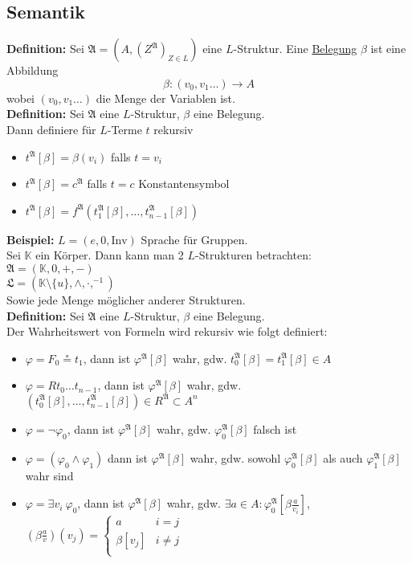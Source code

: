 \documentclass[a4paper]{scrartcl}
\newcommand{\mfa}{\mathfrak{A}}  %
\begin{document}
\subsection{Semantik}
\textbf{Definition:} Sei $\mathfrak{A}=(A,(Z^\mathfrak{A})_{Z \in L})$ eine $L$-Struktur. Eine \underline{Belegung} $\beta$ ist eine Abbildung
$$\beta \colon (v_0,v_1 \dots) \rightarrow A$$
wobei $(v_0,v_1 \dots)$ die Menge der Variablen ist.\medskip\\
\textbf{Definition:} Sei $\mathfrak{A}$ eine $L$-Struktur, $\beta$ eine Belegung.\\
Dann definiere für $L$-Terme $t$ rekursiv
\begin{itemize}
\item $t^\mathfrak{A}[\beta] = \beta(v_i)$ falls $t = v_i$
\item $t^\mathfrak{A}[\beta] = c^\mathfrak{A}$ falls $t = c$ Konstantensymbol
\item $t^\mathfrak{A}[\beta] = f^\mathfrak{A}(t_1^\mathfrak{A}[\beta], \dots ,t_{n-1}^\mathfrak{A}[\beta])$
\end{itemize}
\textbf{Beispiel:} $L=(e,0,\text{Inv})$ Sprache für Gruppen.\\
Sei $\mathbb{K}$ ein Körper. Dann kann man 2 $L$-Strukturen betrachten:\smallskip\\
$\mathfrak{A} = (\mathbb{K},0,+,-)$\\
$\mathfrak{L} = (\mathbb{K} \setminus \{u\},\land,\cdot,^{-1})$\smallskip\\
Sowie jede Menge möglicher anderer Strukturen.\medskip\\
\textbf{Definition:} Sei $\mathfrak{A}$ eine $L$-Struktur, $\beta$ eine Belegung.\\
Der Wahrheitswert von Formeln wird rekursiv wie folgt definiert:
\begin{itemize}
\item $\varphi= F_0 \circeq t_1$, dann ist $\varphi^\mfa[\beta]$ wahr, gdw. $t_0^\mfa[\beta] = t_1^\mfa[\beta] \in A$
\item $\varphi = Rt_0 \dots t_{n-1}$, dann ist $\varphi^\mfa[\beta]$ wahr, gdw. $(t_0^\mfa[\beta], \dots ,t_{n-1}^\mfa[\beta]) \in R^\mfa \subset A^n$
\item $\varphi = \lnot \varphi_0$, dann ist $\varphi^\mfa[\beta]$ wahr, gdw. $\varphi_0^\mfa[\beta]$ falsch ist
\item $\varphi = (\varphi_0 \land \varphi_1)$ dann ist $\varphi^\mfa[\beta]$ wahr, gdw. sowohl $\varphi_0^\mfa[\beta]$ als auch $\varphi_1^\mfa[\beta]$ wahr sind
\item $\varphi = \exists v_i\ \varphi_0$, dann ist $\varphi^\mfa[\beta]$ wahr, gdw. $\exists a \in A \colon \varphi_0^\mfa[\beta \frac{a}{v_i}]$, $(\beta \frac{a}{v})(v_j)=
\begin{cases}
a & i = j\\
\beta[v_j] & i \neq j\\
\end{cases} $
\end{itemize}\ \smallskip\\
\end{document}
